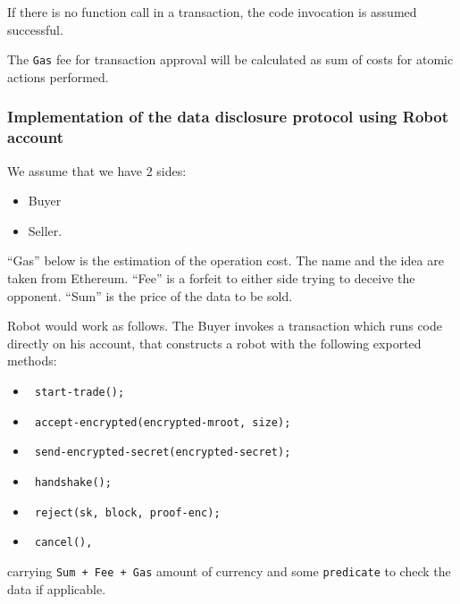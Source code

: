 If there is no function call in a transaction, the code invocation is assumed successful.

The \verb|Gas| fee for transaction approval will be calculated as sum of costs for atomic actions performed.

\subsubsection{Implementation of the data disclosure protocol using Robot account}

We assume that we have 2 sides:
\begin{itemize}
  \item Buyer
  \item Seller.
\end{itemize}

``Gas'' below is the estimation of the operation cost. The name and the idea are taken from Ethereum.
``Fee'' is a forfeit to either side trying to deceive the opponent.
``Sum'' is the price of the data to be sold.

Robot would work as follows. The Buyer invokes a transaction which runs code directly on his account, that constructs a robot with the following exported methods:

\begin{itemize}
  \item \begin{verbatim} start-trade(); \end{verbatim}
  \item \begin{verbatim} accept-encrypted(encrypted-mroot, size); \end{verbatim}
  \item \begin{verbatim} send-encrypted-secret(encrypted-secret); \end{verbatim}
  \item \begin{verbatim} handshake(); \end{verbatim}
  \item \begin{verbatim} reject(sk, block, proof-enc); \end{verbatim}
  \item \begin{verbatim} cancel(), \end{verbatim}
\end{itemize}
carrying \verb|Sum + Fee + Gas| amount of currency and some \verb|predicate| to check the data if applicable.

